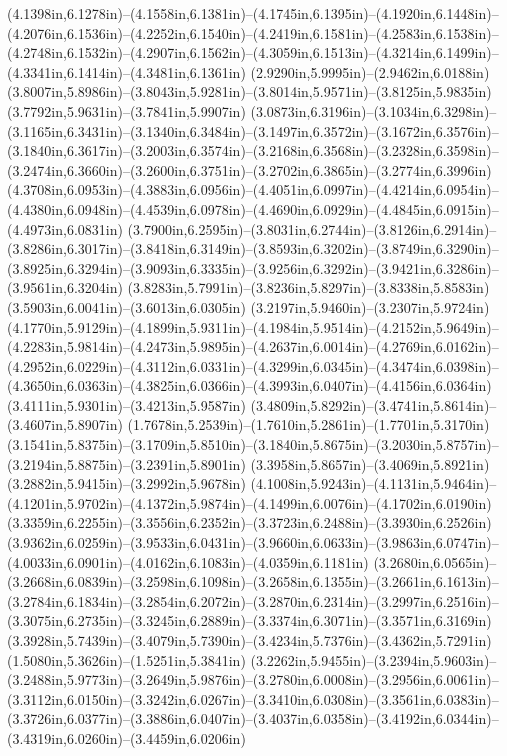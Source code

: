 (4.1398in,6.1278in)--(4.1558in,6.1381in)--(4.1745in,6.1395in)--(4.1920in,6.1448in)--(4.2076in,6.1536in)--(4.2252in,6.1540in)--(4.2419in,6.1581in)--(4.2583in,6.1538in)--(4.2748in,6.1532in)--(4.2907in,6.1562in)--(4.3059in,6.1513in)--(4.3214in,6.1499in)--(4.3341in,6.1414in)--(4.3481in,6.1361in) (2.9290in,5.9995in)--(2.9462in,6.0188in) (3.8007in,5.8986in)--(3.8043in,5.9281in)--(3.8014in,5.9571in)--(3.8125in,5.9835in) (3.7792in,5.9631in)--(3.7841in,5.9907in) (3.0873in,6.3196in)--(3.1034in,6.3298in)--(3.1165in,6.3431in)--(3.1340in,6.3484in)--(3.1497in,6.3572in)--(3.1672in,6.3576in)--(3.1840in,6.3617in)--(3.2003in,6.3574in)--(3.2168in,6.3568in)--(3.2328in,6.3598in)--(3.2474in,6.3660in)--(3.2600in,6.3751in)--(3.2702in,6.3865in)--(3.2774in,6.3996in) (4.3708in,6.0953in)--(4.3883in,6.0956in)--(4.4051in,6.0997in)--(4.4214in,6.0954in)--(4.4380in,6.0948in)--(4.4539in,6.0978in)--(4.4690in,6.0929in)--(4.4845in,6.0915in)--(4.4973in,6.0831in) (3.7900in,6.2595in)--(3.8031in,6.2744in)--(3.8126in,6.2914in)--(3.8286in,6.3017in)--(3.8418in,6.3149in)--(3.8593in,6.3202in)--(3.8749in,6.3290in)--(3.8925in,6.3294in)--(3.9093in,6.3335in)--(3.9256in,6.3292in)--(3.9421in,6.3286in)--(3.9561in,6.3204in) (3.8283in,5.7991in)--(3.8236in,5.8297in)--(3.8338in,5.8583in) (3.5903in,6.0041in)--(3.6013in,6.0305in) (3.2197in,5.9460in)--(3.2307in,5.9724in) (4.1770in,5.9129in)--(4.1899in,5.9311in)--(4.1984in,5.9514in)--(4.2152in,5.9649in)--(4.2283in,5.9814in)--(4.2473in,5.9895in)--(4.2637in,6.0014in)--(4.2769in,6.0162in)--(4.2952in,6.0229in)--(4.3112in,6.0331in)--(4.3299in,6.0345in)--(4.3474in,6.0398in)--(4.3650in,6.0363in)--(4.3825in,6.0366in)--(4.3993in,6.0407in)--(4.4156in,6.0364in) (3.4111in,5.9301in)--(3.4213in,5.9587in) (3.4809in,5.8292in)--(3.4741in,5.8614in)--(3.4607in,5.8907in) (1.7678in,5.2539in)--(1.7610in,5.2861in)--(1.7701in,5.3170in) (3.1541in,5.8375in)--(3.1709in,5.8510in)--(3.1840in,5.8675in)--(3.2030in,5.8757in)--(3.2194in,5.8875in)--(3.2391in,5.8901in) (3.3958in,5.8657in)--(3.4069in,5.8921in) (3.2882in,5.9415in)--(3.2992in,5.9678in) (4.1008in,5.9243in)--(4.1131in,5.9464in)--(4.1201in,5.9702in)--(4.1372in,5.9874in)--(4.1499in,6.0076in)--(4.1702in,6.0190in) (3.3359in,6.2255in)--(3.3556in,6.2352in)--(3.3723in,6.2488in)--(3.3930in,6.2526in) (3.9362in,6.0259in)--(3.9533in,6.0431in)--(3.9660in,6.0633in)--(3.9863in,6.0747in)--(4.0033in,6.0901in)--(4.0162in,6.1083in)--(4.0359in,6.1181in) (3.2680in,6.0565in)--(3.2668in,6.0839in)--(3.2598in,6.1098in)--(3.2658in,6.1355in)--(3.2661in,6.1613in)--(3.2784in,6.1834in)--(3.2854in,6.2072in)--(3.2870in,6.2314in)--(3.2997in,6.2516in)--(3.3075in,6.2735in)--(3.3245in,6.2889in)--(3.3374in,6.3071in)--(3.3571in,6.3169in) (3.3928in,5.7439in)--(3.4079in,5.7390in)--(3.4234in,5.7376in)--(3.4362in,5.7291in) (1.5080in,5.3626in)--(1.5251in,5.3841in) (3.2262in,5.9455in)--(3.2394in,5.9603in)--(3.2488in,5.9773in)--(3.2649in,5.9876in)--(3.2780in,6.0008in)--(3.2956in,6.0061in)--(3.3112in,6.0150in)--(3.3242in,6.0267in)--(3.3410in,6.0308in)--(3.3561in,6.0383in)--(3.3726in,6.0377in)--(3.3886in,6.0407in)--(3.4037in,6.0358in)--(3.4192in,6.0344in)--(3.4319in,6.0260in)--(3.4459in,6.0206in) 